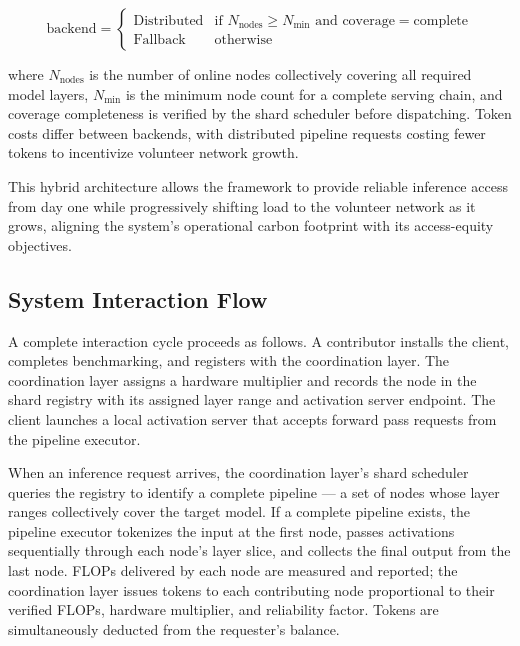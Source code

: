 \documentclass[12pt]{article}
\begin{document}
\begin{equation}
\text{backend} =
\begin{cases}
\text{Distributed} & \text{if } N_{\text{nodes}} \geq N_{\text{min}} \text{ and } \text{coverage} = \text{complete} \\
\text{Fallback} & \text{otherwise}
\end{cases}
\label{eq:routing}
\end{equation}

where $N_{\text{nodes}}$ is the number of online nodes collectively covering all required model layers, $N_{\text{min}}$ is the minimum node count for a complete serving chain, and coverage completeness is verified by the shard scheduler before dispatching. Token costs differ between backends, with distributed pipeline requests costing fewer tokens to incentivize volunteer network growth.

This hybrid architecture allows the framework to provide reliable inference access from day one while progressively shifting load to the volunteer network as it grows, aligning the system's operational carbon footprint with its access-equity objectives.

\subsection{System Interaction Flow}

A complete interaction cycle proceeds as follows. A contributor installs the client, completes benchmarking, and registers with the coordination layer. The coordination layer assigns a hardware multiplier and records the node in the shard registry with its assigned layer range and activation server endpoint. The client launches a local activation server that accepts forward pass requests from the pipeline executor.

When an inference request arrives, the coordination layer's shard scheduler queries the registry to identify a complete pipeline — a set of nodes whose layer ranges collectively cover the target model. If a complete pipeline exists, the pipeline executor tokenizes the input at the first node, passes activations sequentially through each node's layer slice, and collects the final output from the last node. FLOPs delivered by each node are measured and reported; the coordination layer issues tokens to each contributing node proportional to their verified FLOPs, hardware multiplier, and reliability factor. Tokens are simultaneously deducted from the requester's balance.
\end{document}
